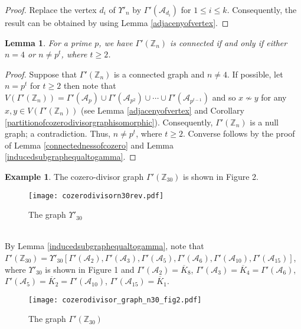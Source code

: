 \documentclass{amsart}
\theoremstyle{plain}
\newtheorem{lemma}[theorem]{Lemma}
\theoremstyle{definition}
\newtheorem{example}[theorem]{Example}
\theoremstyle{remark}
\begin{document}
\begin{proof}
Replace the vertex $d_i$ of $\Upsilon'_n$ by $\Gamma'(\mathcal{A}_{d_i})$ for $1 \leq i \leq k$. Consequently, the result can be obtained by using Lemma \ref{adjacenyofvertex}. 
\end{proof}

\begin{lemma}
For a prime $p$, we have $\Gamma'(\mathbb{Z}_n)$ is connected if and only if either $n = 4$ or $n \neq p^t$, where $t \geq 2$.
\end{lemma}
\begin{proof}
Suppose that $\Gamma'(\mathbb{Z}_n)$ is a connected graph and $n \ne 4$. If possible, let $n = p^t$ for $t \geq 2$ then note that $V(\Gamma'(\mathbb{Z}_n)) = \Gamma'(\mathcal{A}_{p}) \cup \Gamma'(\mathcal{A}_{p^2}) \cup \cdots \cup \Gamma'(\mathcal{A}_{p^{t-1}})$ and so $x \nsim y$ for any $x, y \in V(\Gamma'(\mathbb{Z}_n))$ (see Lemma \ref{adjacenyofvertex} and Corollary \ref{partitionofcozerodivisorgraphisomorphic}). Consequently, $\Gamma'(\mathbb{Z}_n)$ is a null graph; a contradiction. Thus, $n \neq p^t$, where $t \geq 2$. Converse follows by the proof of Lemma \ref{connectednessofcozero} and  Lemma \ref{inducedsubgraphequaltogamma}. 
\end{proof}

\begin{example}
The cozero-divisor graph $\Gamma'(\mathbb{Z}_{30})$ is shown in Figure 2. 
\begin{figure}[h!]
\centering
\texttt{[image: cozerodivisorn30rev.pdf]}
\caption{The graph $\Upsilon'_{30}$}
\end{figure} \\
By Lemma \ref{inducedsubgraphequaltogamma}, note that  $\Gamma'(\mathbb{Z}_{30}) = \Upsilon'_{30} [\Gamma'(\mathcal{A}_{2}), \Gamma'(\mathcal{A}_{3}), \Gamma'(\mathcal{A}_{5}), \Gamma'(\mathcal{A}_{6}), \Gamma'(\mathcal{A}_{10}),  \Gamma'(\mathcal{A}_{15})]$, where $\Upsilon'_{30}$ is shown in Figure 1 and  $\Gamma'(\mathcal{A}_{2}) = \overline{K}_8$, $\Gamma'(\mathcal{A}_{3}) = \overline{K}_4 = \Gamma'(\mathcal{A}_{6})$, $\Gamma'(\mathcal{A}_{5}) = \overline{K}_2 = \Gamma'(\mathcal{A}_{10})$,  $\Gamma'(\mathcal{A}_{15}) = \overline{K}_1$. 
\begin{figure}[h!]
\centering
\texttt{[image: cozerodivisor\_graph\_n30\_fig2.pdf]}
\caption{The graph $\Gamma'(\mathbb{Z}_{30})$}
\end{figure}
\end{example}
\end{document}

